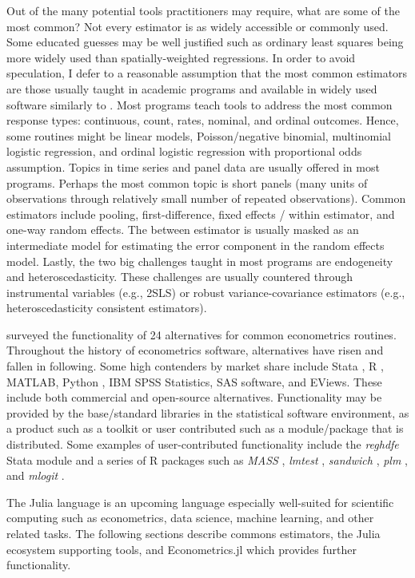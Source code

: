 \documentclass{juliacon}
\begin{document}
Out of the many potential tools practitioners may require, what are some of the most common? Not every estimator is as widely accessible or commonly used. Some educated guesses may be well justified such as ordinary least squares being more widely used than spatially-weighted regressions. In order to avoid speculation, I defer to a reasonable assumption that the most common estimators are those usually taught in academic programs and available in widely used software similarly to \cite{Renfro_2009}. Most programs teach tools to address the most common response types: continuous, count, rates, nominal, and ordinal outcomes. Hence, some routines might be linear models, Poisson/negative binomial, multinomial logistic regression, and ordinal logistic regression with proportional odds assumption. Topics in time series and panel data are usually offered in most programs. Perhaps the most common topic is short panels (many units of observations through relatively small number of repeated observations). Common estimators include pooling, first-difference, fixed effects / within estimator, and one-way random effects. The between estimator is usually masked as an intermediate model for estimating the error component in the random effects model. Lastly, the two big challenges taught in most programs are endogeneity and heteroscedasticity. These challenges are usually countered through instrumental variables (e.g., 2SLS) or robust variance-covariance estimators (e.g., heteroscedasticity consistent estimators).

\cite{Renfro_2009} surveyed the functionality of 24 alternatives for common econometrics routines. Throughout the history of econometrics software, alternatives have risen and fallen in following. Some high contenders by market share include Stata \cite{Stata}, R \cite{R}, MATLAB, Python \cite{Python}, IBM SPSS Statistics, SAS software, and EViews. These include both commercial and open-source alternatives. Functionality may be provided by the base/standard libraries in the statistical software environment, as a product such as a toolkit or user contributed such as a module/package that is distributed. Some examples of user-contributed functionality include the \textit{reghdfe} Stata module and a series of R packages such as \textit{MASS} \cite{MASS}, \textit{lmtest} \cite{lmtest}, \textit{sandwich} \cite{sandwich}, \textit{plm} \cite{plm}, and \textit{mlogit} \cite{mlogit}.

The Julia language \cite{Bezanson_Edelman_Karpinski_Shah_2017} is an upcoming language especially well-suited for scientific computing such as econometrics, data science, machine learning, and other related tasks. The following sections describe commons estimators, the Julia ecosystem supporting tools, and Econometrics.jl which provides further functionality.
\end{document}
